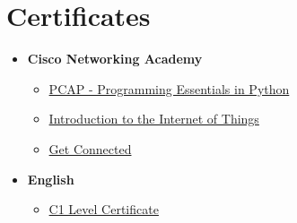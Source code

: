 \documentclass[letterpaper,11pt]{article}
\newcommand{\resumeSubHeadingListStart}{\begin{itemize}[leftmargin=*]}
\newcommand{\resumeSubHeadingListEnd}{\end{itemize}}
\begin{document}
\section{Certificates}
\resumeSubHeadingListStart
    \item{
        \textbf{Cisco Networking Academy}
        {
            \resumeSubHeadingListStart
                \item{\href{https://github.com/aleemont1/curriculum-vitae/blob/main/certificates/PYTHON-2020_certificate.pdf}{PCAP - Programming Essentials in Python}}
                \item{\href{https://github.com/aleemont1/curriculum-vitae/blob/main/certificates/IOT-2018_certificate.pdf}{Introduction to the Internet of Things}}
                \item{\href{https://github.com/aleemont1/curriculum-vitae/blob/main/certificates/GetConnected-2017_certificate.pdf}{Get Connected}}
            \resumeSubHeadingListEnd
        }
    }
    \item{
        \textbf{English}
        {
            \resumeSubHeadingListStart
                \item{\href{https://github.com/aleemont1/curriculum-vitae/blob/main/certificates/English_C1.pdf}{C1 Level Certificate}}
            \resumeSubHeadingListEnd
        }
    }
\resumeSubHeadingListEnd
\end{document}

